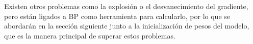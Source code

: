 Existen otros problemas como la explosión o el desvanecimiento del gradiente, pero están ligados a BP como herramienta para calcularlo, por lo que se abordarán en la sección siguiente junto a la inicialización de pesos del modelo, que es la manera principal de superar estos problemas. 





